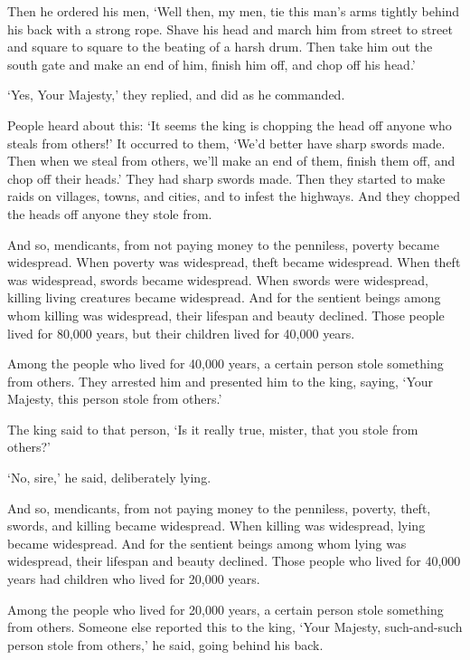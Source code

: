 \documentclass[12pt,openany]{book}%
\begin{document}
Then he ordered his men, ‘Well then, my men, tie this man’s arms tightly behind his back with a strong rope. Shave his head and march him from street to street and square to square to the beating of a harsh drum. Then take him out the south gate and make an end of him, finish him off, and chop off his head.’ 

‘Yes, Your Majesty,’ they replied, and did as he commanded. 

People heard about this: ‘It seems the king is chopping the head off anyone who steals from others!’ It occurred to them, ‘We’d better have sharp swords made. Then when we steal from others, we’ll make an end of them, finish them off, and chop off their heads.’ They had sharp swords made. Then they started to make raids on villages, towns, and cities, and to infest the highways. And they chopped the heads off anyone they stole from. 

And so, mendicants, from not paying money to the penniless, poverty became widespread. When poverty was widespread, theft became widespread. When theft was widespread, swords became widespread. When swords were widespread, killing living creatures became widespread. And for the sentient beings among whom killing was widespread, their lifespan and beauty declined. Those people lived for 80,000 years, but their children lived for 40,000 years. 

Among the people who lived for 40,000 years, a certain person stole something from others. They arrested him and presented him to the king, saying, ‘Your Majesty, this person stole from others.’ 

The king said to that person, ‘Is it really true, mister, that you stole from others?’ 

‘No, sire,’ he said, deliberately lying. 

And so, mendicants, from not paying money to the penniless, poverty, theft, swords, and killing became widespread. When killing was widespread, lying became widespread. And for the sentient beings among whom lying was widespread, their lifespan and beauty declined. Those people who lived for 40,000 years had children who lived for 20,000 years. 

Among the people who lived for 20,000 years, a certain person stole something from others. Someone else reported this to the king, ‘Your Majesty, such-and-such person stole from others,’ he said, going behind his back. 
\end{document}
